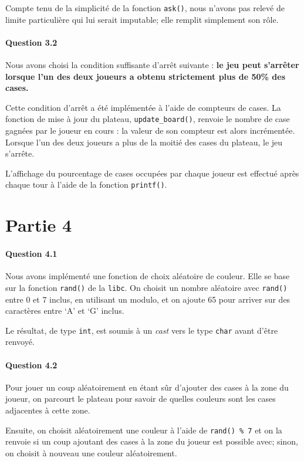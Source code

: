 \documentclass[a4paper]{article}
\begin{document}
Compte tenu de la simplicité de la fonction \texttt{ask()}, nous n'avons pas 
relevé de limite particulière qui lui serait imputable; elle remplit simplement 
son rôle.
    \paragraph{Question 3.2}
    Nous avons choisi la condition suffisante d'arrêt suivante : \textbf{le jeu 
peut s'arrêter lorsque l'un des deux joueurs a obtenu strictement plus de 50\% 
des cases.}

Cette condition d'arrêt a été implémentée à l'aide de compteurs de cases. La 
fonction de mise à jour du plateau, \texttt{update\_board()}, renvoie le nombre 
de case gagnées par le joueur en cours : la valeur de son compteur est alors 
incrémentée. Lorsque l'un des deux joueurs a plus de la moitié des cases du 
plateau, le jeu s'arrête.

L'affichage du pourcentage de cases occupées par chaque joueur est effectué 
après chaque tour à l'aide de la fonction \texttt{printf()}.
    \section{Partie 4}
    \paragraph{Question 4.1} 
    Nous avons implémenté une fonction de choix aléatoire de couleur. Elle se 
base sur la fonction \texttt{rand()} de la \texttt{libc}. On choisit un nombre 
aléatoire avec \texttt{rand()} entre 0 et 7 inclus, en utilisant un modulo, et 
on ajoute 65 pour arriver sur des caractères entre `A' et `G' inclus. 

Le résultat, de type \texttt{int}, est soumis à un \emph{cast} vers le type 
\texttt{char} avant d'être renvoyé.

    \paragraph{Question 4.2} 
    Pour jouer un coup aléatoirement en étant sûr d'ajouter des cases à la 
zone du joueur, on parcourt le plateau pour savoir de quelles couleurs sont les 
cases adjacentes à cette zone. 

Ensuite, on choisit aléatoirement une couleur à l'aide de \texttt{rand() \% 
7} et on la renvoie si un coup ajoutant des cases à la zone du joueur est 
possible avec; sinon, on choisit à nouveau une couleur aléatoirement.
\end{document}
